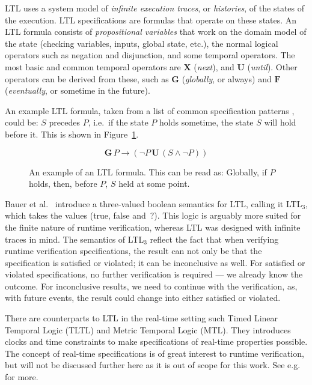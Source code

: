 \documentclass[a4paper,11pt]{kth-mag}
\theoremstyle{definition}
\begin{document}
LTL uses a system model of \textit{infinite execution traces}, or
\textit{histories}, of the states of the execution. LTL specifications are
formulas that operate on these states. An LTL formula consists of
\textit{propositional variables} that work on the domain model of the state
(checking variables, inputs, global state, etc.), the normal logical operators
such as negation and disjunction, and some temporal operators. The most basic
and common temporal operators are $\boldsymbol{X}$ (\textit{next}), and
$\boldsymbol{U}$ (\textit{until}). Other operators can be derived from these,
such as $\boldsymbol{G}$ (\textit{globally}, or always) and $\boldsymbol{F}$
(\textit{eventually}, or sometime in the future).

An example LTL formula, taken from a list of common specification patterns
\cite{dwyer99patterns}, could be: $S$ precedes $P$, i.e.\ if the state $P$
holds sometime, the state $S$ will hold before it. This is shown in
Figure~\ref{figure-ltl}.

\begin{figure}[h!]
	\[
	\boldsymbol{G} \, P \rightarrow (\neg P \, \boldsymbol{U} \, (S \wedge \neg P))
	\]

	\caption{An example of an LTL formula. This can be read as: Globally, if $P$
	holds, then, before $P$, $S$ held at some point.}
	\label{figure-ltl}
\end{figure}

Bauer et al.\ \cite{bauer06monitoring} introduce a three-valued boolean
semantics for LTL, calling it LTL$_3$, which takes the values (true, false
and~?). This logic is arguably more suited for the finite nature of runtime
verification, whereas LTL was designed with infinite traces in mind. The
semantics of LTL$_3$ reflect the fact that when verifying runtime verification
specifications, the result can not only be that the specification is satisfied
or violated; it can be inconclusive as well. For satisfied or violated
specifications, no further verification is required --- we already know the
outcome. For inconclusive results, we need to continue with the verification,
as, with future events, the result could change into either satisfied or
violated.

There are counterparts to LTL in the real-time setting such Timed Linear
Temporal Logic (TLTL) and Metric Temporal Logic (MTL). They introduces clocks
and time constraints to make specifications of real-time properties possible.
The concept of real-time specifications is of great interest to runtime
verification, but will not be discussed further here as it is out of scope for
this work. See e.g.\ \cite{bauer06monitoring,drusinsky00temporalrover} for
more.
\end{document}
